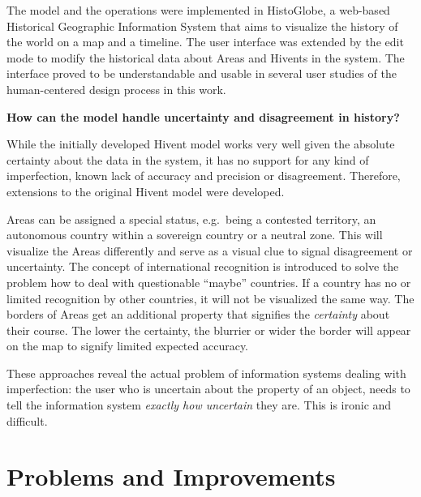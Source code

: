 The model and the operations were implemented in HistoGlobe, a web-based Historical Geographic Information System that aims to visualize the history of the world on a map and a timeline. The user interface was extended by the edit mode to modify the historical data about Areas and Hivents in the system.
The interface proved to be understandable and usable in several user studies of the human-centered design process in this work.

\begin{description}[labelindent=0.55em]
  \item[\textbf{3)}]
  \textbf{
    How can the model handle uncertainty and disagreement in history?
  }
\end{description}

While the initially developed Hivent model works very well given the absolute certainty about the data in the system, it has no support for any kind of imperfection, known lack of accuracy and precision or disagreement. Therefore, extensions to the original Hivent model were developed.

Areas can be assigned a special status, e.g.\ being a contested territory, an autonomous country within a sovereign country or a neutral zone. This will visualize the Areas differently and serve as a visual clue to signal disagreement or uncertainty. The concept of international recognition is introduced to solve the problem how to deal with questionable ``maybe'' countries. If a country has no or limited recognition by other countries, it will not be visualized the same way. The borders of Areas get an additional property that signifies the \emph{certainty} about their course. The lower the certainty, the blurrier or wider the border will appear on the map to signify limited expected accuracy.

These approaches reveal the actual problem of information systems dealing with imperfection: the user who is uncertain about the property of an object, needs to tell the information system \emph{exactly how uncertain} they are. This is ironic and difficult.


\section{Problems and Improvements} %
\label{sec:problems}

